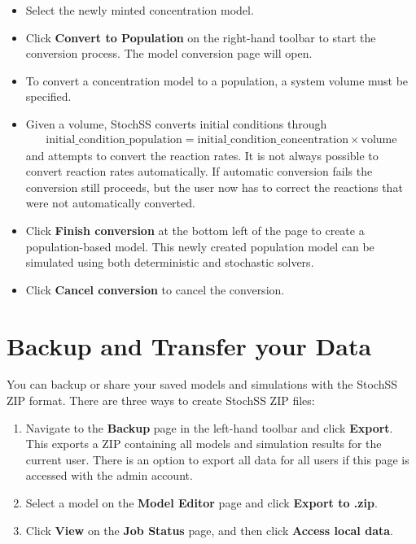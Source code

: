 \begin{itemize}
  \item Select the newly minted concentration model.
  \item Click \textbf{Convert to Population} on the right-hand toolbar to start the conversion process. The model conversion page will open.
  \item To convert a concentration model to a population, a system volume must be specified.
  \item Given a volume, StochSS converts initial conditions through 
  \begin{align}
  \mathrm{initial\_condition\_population} = \mathrm{initial\_condition\_concentration}\times\mathrm{volume}
  \end{align}
   and attempts to convert the reaction rates. It is not always possible to convert reaction rates automatically. If automatic conversion fails the conversion still proceeds, but the user now has to correct the reactions that were not automatically converted.
  \item Click \textbf{Finish conversion} at the bottom left of the page to create a population-based model. This newly created population model can be simulated using both deterministic and stochastic solvers.
  \item Click \textbf{Cancel conversion} to cancel the conversion.
\end{itemize}


\section{Backup and Transfer your Data}
You can backup or share your saved models and simulations with the StochSS ZIP format. There are three ways to create StochSS ZIP files:

\begin{enumerate}
\item Navigate to the \textbf{Backup} page in the left-hand toolbar and click \textbf{Export}. This exports a ZIP containing all models and simulation results for the current user. There is an option to export all data for all users if this page is accessed with the admin account.
\item Select a model on the \textbf{Model Editor} page and click \textbf{Export to .zip}.
\item Click \textbf{View} on the \textbf{Job Status} page, and then click \textbf{Access local data}.
\end{enumerate}

